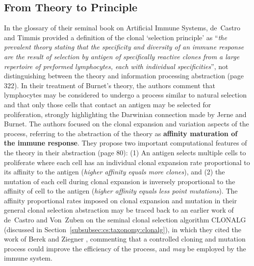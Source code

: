 %
%
\subsection{From Theory to Principle}
\label{subsec:cs:algorithms:principle}
In the glossary of their seminal book on Artificial Immune Systems, de~Castro and Timmis provided a definition of the clonal `selection principle' as ``\emph{the prevalent theory stating that the specificity and diversity of an immune response are the result of selection by antigen of specifically reactive clones from a large repertoire of preformed lymphocytes, each with individual specificities}'', not distinguishing between the theory and information processing abstraction \cite{Castro2002a} (page 322). In their treatment of Burnet's theory, the authors comment that lymphocytes may be considered to undergo a process similar to natural selection and that only those cells that contact an antigen may be selected for proliferation, strongly highlighting the Darwinian connection made by Jerne and Burnet. The authors focused on the clonal expansion and variation aspects of the process, referring to the abstraction of the theory as \textbf{affinity maturation of the immune response}. They propose two important computational features of the theory in their abstraction (page 80): (1) An antigen selects multiple cells to proliferate where each cell has an individual clonal expansion rate proportional to its affinity to the antigen (\emph{higher affinity equals more clones}), and (2) the mutation of each cell during clonal expansion is inversely proportional to the affinity of cell to the antigen (\emph{higher affinity equals less point mutations}). The affinity proportional rates imposed on clonal expansion and mutation in their general clonal selection abstraction may be traced back to an earlier work of de~Castro and Von~Zuben on the seminal clonal selection algorithm CLONALG \cite{Castro2000} (discussed in Section~\ref{subsubsec:cs:taxonomy:clonalg}), in which they cited the work of Berek and Ziegner \cite{Berek1993}, commenting that a controlled cloning and mutation process could improve the efficiency of the process, and \emph{may} be employed by the immune system. 

